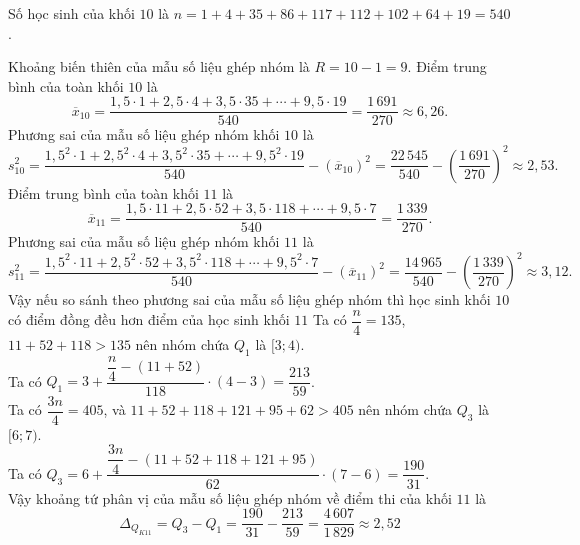 \begin{ex}
{		Số học sinh của khối $10$ là $n=1+4+35+86+117+112+102+64+19=540$.
		\begin{itemchoice}
			\itemch Khoảng biến thiên của mẫu số liệu ghép nhóm là $R=10-1=9$.
			\itemch Điểm trung bình của toàn khối $10$ là
			$$\overline{x}_{10}=\dfrac{1{,}5\cdot 1+2{,}5\cdot 4+3{,}5\cdot 35+\cdots +9{,}5\cdot 19}{540}=\dfrac{1\,691}{270}\approx 6{,}26.$$
			\itemch 
			Phương sai của mẫu số liệu ghép nhóm khối $10$ là
			$$s^2_{10}=\dfrac{1{,}5^2\cdot 1+2{,}5^2\cdot 4+3{,}5^2\cdot 35+\cdots +9{,}5^2\cdot 19}{540}-\left(\overline{x}_{10}\right)^2=\dfrac{22\,545}{540}-\left(\dfrac{1\,691}{270}\right)^2\approx 2{,}53.$$
			Điểm trung bình của toàn khối $11$ là
			$$\overline{x}_{11}=\dfrac{1{,}5\cdot 11+2{,}5\cdot 52+3{,}5\cdot 118+\cdots +9{,}5\cdot 7}{540}=\dfrac{1\,339}{270}.$$
			Phương sai của mẫu số liệu ghép nhóm khối $11$ là
			$$s^2_{11}=\dfrac{1{,}5^2\cdot 11+2{,}5^2\cdot 52+3{,}5^2\cdot 118+\cdots +9{,}5^2\cdot 7}{540}-\left(\overline{x}_{11}\right)^2=\dfrac{14\,965}{540}-\left(\dfrac{1\,339}{270}\right)^2\approx 3{,}12.$$
			Vậy nếu so sánh theo phương sai của mẫu số liệu ghép nhóm thì học sinh khối $10$ có điểm đồng đều hơn điểm của học sinh khối $11$	
			\itemch 
			Ta có $\dfrac{n}{4}=135$, $11+52+118>135$ nên nhóm chứa $Q_1$ là $[3;4)$.\\
			Ta có $Q_1=3+\dfrac{\dfrac{n}{4}-(11+52)}{118}\cdot (4-3)=\dfrac{213}{59}$.\\
			Ta có $\dfrac{3n}{4}=405$, và $11+52+118+121+95+62>405$ nên nhóm chứa $Q_3$ là $[6;7)$.\\
			Ta có $Q_3=6+\dfrac{\dfrac{3n}{4}-(11+52+118+121+95)}{62}\cdot (7-6)=\dfrac{190}{31}$.\\
			Vậy khoảng tứ phân vị của mẫu số liệu ghép nhóm về điểm thi của khối $11$ là $$\Delta_{Q_{K11}}= Q_3-Q_1=\dfrac{190}{31}-\dfrac{213}{59} = \dfrac{4\,607}{1\,829} \approx 2{,}52$$
			
			
		\end{itemchoice}	
	}
\end{ex}
\caukq
